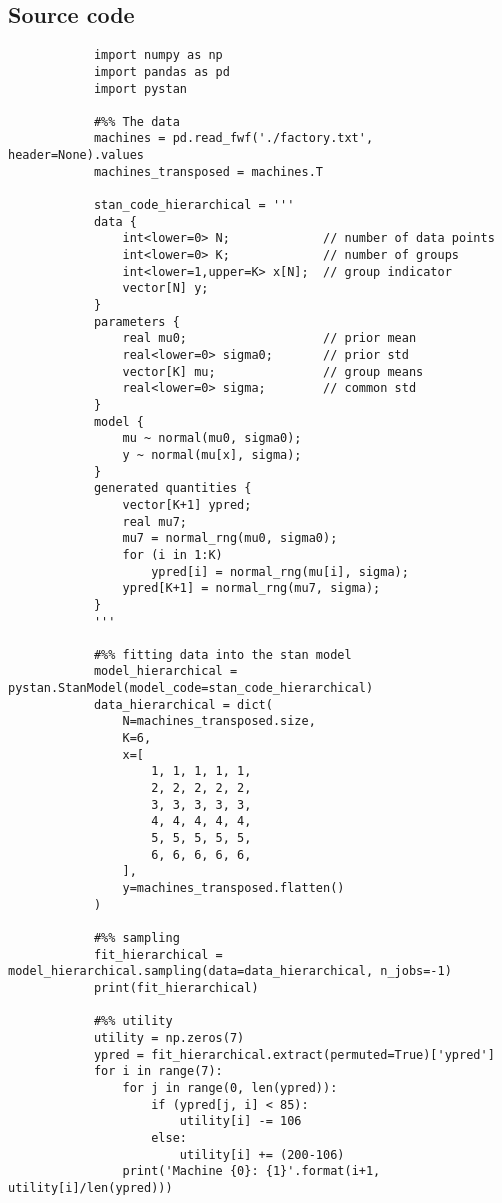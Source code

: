\documentclass[11pt,a4paper,english]{article}
\begin{document}
      \begin{appendices}
      \section{Source code}
          \begin{verbatim}
            import numpy as np
            import pandas as pd
            import pystan

            #%% The data
            machines = pd.read_fwf('./factory.txt', header=None).values
            machines_transposed = machines.T

            stan_code_hierarchical = '''
            data {
                int<lower=0> N;             // number of data points
                int<lower=0> K;             // number of groups
                int<lower=1,upper=K> x[N];  // group indicator
                vector[N] y;
            }
            parameters {
                real mu0;                   // prior mean
                real<lower=0> sigma0;       // prior std
                vector[K] mu;               // group means
                real<lower=0> sigma;        // common std
            }
            model {
                mu ~ normal(mu0, sigma0);
                y ~ normal(mu[x], sigma);
            }
            generated quantities {
                vector[K+1] ypred;
                real mu7;
                mu7 = normal_rng(mu0, sigma0);
                for (i in 1:K)
                    ypred[i] = normal_rng(mu[i], sigma);
                ypred[K+1] = normal_rng(mu7, sigma);
            }
            '''

            #%% fitting data into the stan model
            model_hierarchical = pystan.StanModel(model_code=stan_code_hierarchical)
            data_hierarchical = dict(
                N=machines_transposed.size,
                K=6,
                x=[
                    1, 1, 1, 1, 1,
                    2, 2, 2, 2, 2,
                    3, 3, 3, 3, 3,
                    4, 4, 4, 4, 4,
                    5, 5, 5, 5, 5,
                    6, 6, 6, 6, 6,
                ],
                y=machines_transposed.flatten()
            )

            #%% sampling
            fit_hierarchical = model_hierarchical.sampling(data=data_hierarchical, n_jobs=-1)
            print(fit_hierarchical)

            #%% utility
            utility = np.zeros(7)
            ypred = fit_hierarchical.extract(permuted=True)['ypred']
            for i in range(7):
                for j in range(0, len(ypred)):
                    if (ypred[j, i] < 85):
                        utility[i] -= 106
                    else:
                        utility[i] += (200-106)
                print('Machine {0}: {1}'.format(i+1, utility[i]/len(ypred)))
          \end{verbatim}
      \end{appendices}
  
\end{document}
